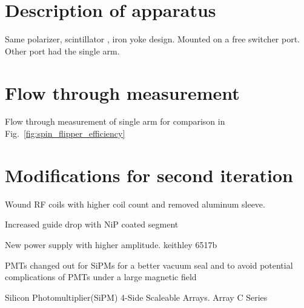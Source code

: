 
\section{Description of apparatus}


Same polarizer, \BZnS scintillator , iron yoke design. Mounted on a free switcher port. Other port had the single arm. 


\section{Flow through measurement}


Flow through measurement of single arm for comparison in Fig.~\ref{fig:spin_flipper_efficiency}



\section{Modifications for second iteration}


Wound RF coils with higher coil count and removed aluminum sleeve.

Increased guide drop with NiP coated segment

New power supply with higher amplitude. keithley 6517b

PMTs changed out for SiPMs for a better vacuum seal and to avoid potential complications of PMTs under a large magnetic field

Silicon Photomultiplier(SiPM) 4-Side Scaleable Arrays. Array C Series